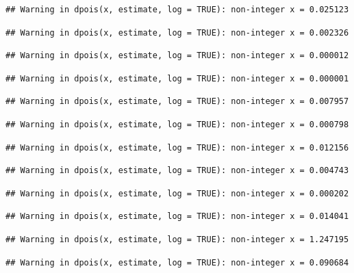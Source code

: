 \documentclass[]{article}
\begin{document}
\begin{verbatim}
## Warning in dpois(x, estimate, log = TRUE): non-integer x = 0.025123
\end{verbatim}

\begin{verbatim}
## Warning in dpois(x, estimate, log = TRUE): non-integer x = 0.002326
\end{verbatim}

\begin{verbatim}
## Warning in dpois(x, estimate, log = TRUE): non-integer x = 0.000012
\end{verbatim}

\begin{verbatim}
## Warning in dpois(x, estimate, log = TRUE): non-integer x = 0.000001
\end{verbatim}

\begin{verbatim}
## Warning in dpois(x, estimate, log = TRUE): non-integer x = 0.007957
\end{verbatim}

\begin{verbatim}
## Warning in dpois(x, estimate, log = TRUE): non-integer x = 0.000798
\end{verbatim}

\begin{verbatim}
## Warning in dpois(x, estimate, log = TRUE): non-integer x = 0.012156
\end{verbatim}

\begin{verbatim}
## Warning in dpois(x, estimate, log = TRUE): non-integer x = 0.004743
\end{verbatim}

\begin{verbatim}
## Warning in dpois(x, estimate, log = TRUE): non-integer x = 0.000202
\end{verbatim}

\begin{verbatim}
## Warning in dpois(x, estimate, log = TRUE): non-integer x = 0.014041
\end{verbatim}

\begin{verbatim}
## Warning in dpois(x, estimate, log = TRUE): non-integer x = 1.247195
\end{verbatim}

\begin{verbatim}
## Warning in dpois(x, estimate, log = TRUE): non-integer x = 0.090684
\end{verbatim}
\end{document}
